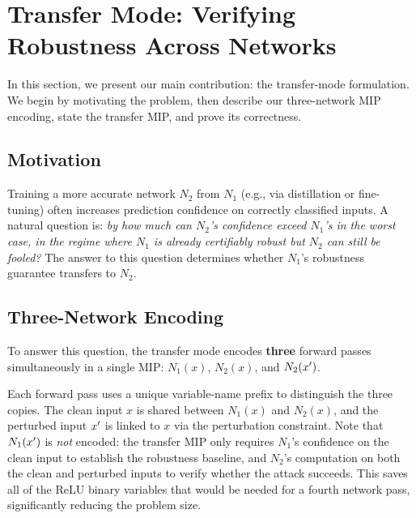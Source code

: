 \section{Transfer Mode: Verifying Robustness Across Networks}
\label{sec:transfer}

In this section, we present our main contribution: the transfer-mode formulation. We begin by motivating the problem, then describe our three-network MIP encoding, state the transfer MIP, and prove its correctness.

\subsection{Motivation}

Training a more accurate network $N_2$ from $N_1$ (e.g., via distillation or fine-tuning) often increases prediction confidence on correctly classified inputs. A natural question is: \emph{by how much can $N_2$'s confidence exceed $N_1$'s in the worst case, in the regime where $N_1$ is already certifiably robust but $N_2$ can still be fooled?} The answer to this question determines whether $N_1$'s robustness guarantee transfers to $N_2$.

\subsection{Three-Network Encoding}

To answer this question, the transfer mode encodes \textbf{three} forward passes simultaneously in a single MIP: $N_1(x)$, $N_2(x)$, and $N_2(x')$.

\begin{center}
\end{center}

Each forward pass uses a unique variable-name prefix to distinguish the three copies. The clean input $x$ is shared between $N_1(x)$ and $N_2(x)$, and the perturbed input $x'$ is linked to $x$ via the perturbation constraint. Note that $N_1(x')$ is \emph{not} encoded: the transfer MIP only requires $N_1$'s confidence on the clean input to establish the robustness baseline, and $N_2$'s computation on both the clean and perturbed inputs to verify whether the attack succeeds. This saves all of the ReLU binary variables that would be needed for a fourth network pass, significantly reducing the problem size.

